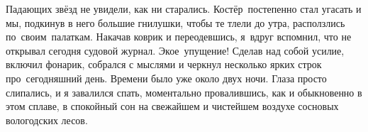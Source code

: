 Падающих звёзд не увидели, как ни старались. Костёр~постепенно стал угасать и мы, подкинув в него большие гнилушки, чтобы те тлели до утра, расползлись по~своим~палаткам. Накачав коврик и переодевшись, я~вдруг вспомнил, что не открывал сегодня судовой журнал. Экое~упущение! Сделав над собой усилие, включил фонарик, собрался с мыслями и черкнул несколько ярких строк про~сегодняшний день. Времени было уже около двух ночи. Глаза просто слипались, и я завалился спать, моментально провалившись, как и обыкновенно в этом сплаве, в спокойный сон на свежайшем и чистейшем воздухе сосновых вологодских лесов.

\begin{center}
\end{center}